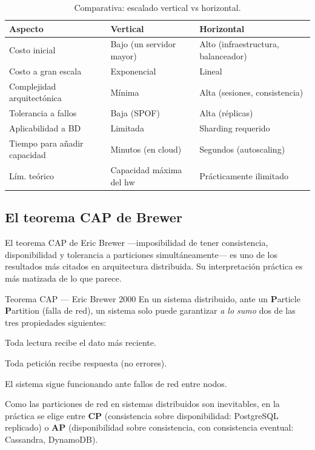 \begin{table}[htbp]
\centering
\caption{Comparativa: escalado vertical vs horizontal.}
\footnotesize
\begin{tabularx}{\textwidth}{lXX}
\toprule
\textbf{Aspecto} & \textbf{Vertical} & \textbf{Horizontal}\\
\midrule
Costo inicial & Bajo (un servidor mayor) & Alto (infraestructura, balanceador)\\
Costo a gran escala & Exponencial & Lineal\\
Complejidad arquitectónica & Mínima & Alta (sesiones, consistencia)\\
Tolerancia a fallos & Baja (SPOF) & Alta (réplicas)\\
Aplicabilidad a BD & Limitada & Sharding requerido\\
Tiempo para añadir capacidad & Minutos (en cloud) & Segundos (autoscaling)\\
Lím. teórico & Capacidad máxima del hw & Prácticamente ilimitado\\
\bottomrule
\end{tabularx}
\end{table}

\subsection{El teorema CAP de Brewer}

El teorema CAP de Eric Brewer ---imposibilidad de tener
consistencia, disponibilidad y tolerancia a particiones
simultáneamente--- es uno de los resultados más citados en
arquitectura distribuida. Su interpretación práctica es más matizada
de lo que parece.


\begin{cajadefinicion}{Teorema CAP --- Eric Brewer 2000}
En un sistema distribuido, ante un \textbf{P}article \textbf{P}artition
(falla de red), un sistema solo puede garantizar
\emph{a lo sumo} dos de las tres propiedades siguientes:

\begin{description}[leftmargin=1.5cm]
\item[Consistency (C).] Toda lectura recibe el dato más reciente.
\item[Availability (A).] Toda petición recibe respuesta (no errores).
\item[Partition tolerance (P).] El sistema sigue funcionando ante
fallos de red entre nodos.
\end{description}

Como las particiones de red en sistemas distribuidos son inevitables,
en la práctica se elige entre \textbf{CP} (consistencia sobre
disponibilidad: PostgreSQL replicado) o \textbf{AP} (disponibilidad
sobre consistencia, con consistencia eventual: Cassandra, DynamoDB).
\end{cajadefinicion}

